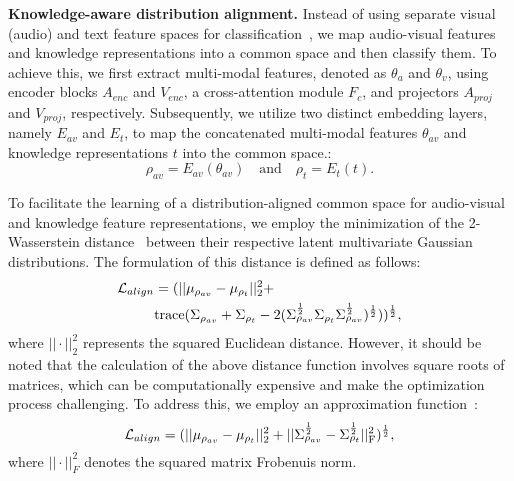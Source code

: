\documentclass[10pt,twocolumn,letterpaper]{article}
\begin{document}
\noindent
\textbf{Knowledge-aware distribution alignment.} Instead of using separate visual (audio) and text feature spaces for classification~\cite{AVCA,HyperbolicAV}, we map audio-visual features and knowledge representations into a common space and then classify them. 
To achieve this, we first extract multi-modal features, denoted as $\theta_a$ and $\theta_v$, using encoder blocks $A_{enc}$ and $V_{enc}$, a cross-attention module $F_c$, and projectors $A_{proj}$ and $V_{proj}$, respectively.
Subsequently, we utilize two distinct embedding layers, namely $E_{av}$ and $E_{t}$, to map the concatenated multi-modal features $\theta_{av}$ and knowledge representations $t$ into the common space.:
\begin{equation}
    \rho_{av} = E_{av}(\theta_{av})\quad \text{and} \quad \rho_{t} = E_{t}(t).
\end{equation}



To facilitate the learning of a distribution-aligned common space for audio-visual and knowledge feature representations, we employ the minimization of the 2-Wasserstein distance~\cite{olkin1982distance} between their respective latent multivariate Gaussian distributions. The formulation of this distance is defined as follows:
\begin{align}
    \mathcal{L}_{align} &= (||\mu_{\rho_{av}}-\mu_{\rho_t}||^2_2+ \\
    &{\rm trace}(\Sigma_{\rho_{av}}+\Sigma_{\rho_{t}}-2(\Sigma_{\rho_{av}}^{\frac{1}{2}}
    \Sigma_{\rho_{t}}
    \Sigma_{\rho_{av}}^{\frac{1}{2}}
    )^{\frac{1}{2}})
)^{\frac{1}{2}},
\end{align}
where $||\cdot||_2^2$ represents the squared Euclidean distance. However, it should be noted that the calculation of the above distance function involves square roots of matrices, which can be computationally expensive and make the optimization process challenging. To address this, we employ an approximation function~\cite{berthelot2017began,he2018wasserstein}:
\begin{equation}
\mathcal{L}_{align} = (||\mu_{\rho_{av}}-\mu_{\rho_t}||^2_2+||\Sigma_{\rho_{av}}^{\frac{1}{2}}-\Sigma_{\rho_t}^{\frac{1}{2}}||^2_{\rm F})^{\frac{1}{2}},
\end{equation}
where $||\cdot||_F^2$ denotes the squared 
matrix Frobenuis norm.
\end{document}
